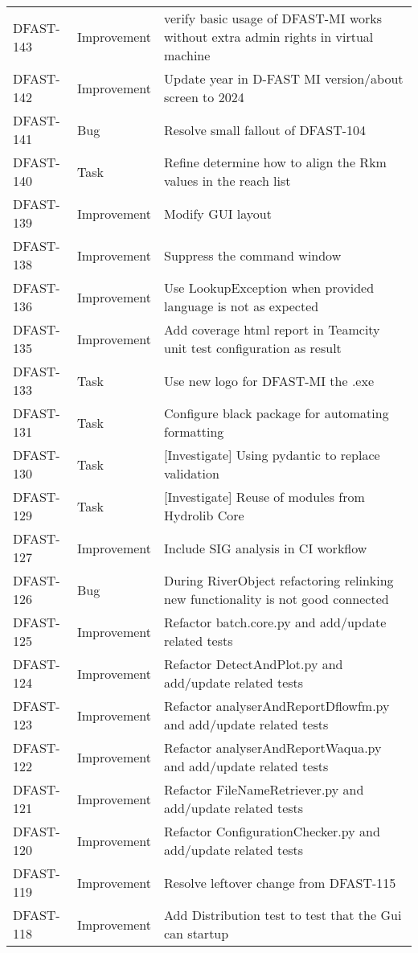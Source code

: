 \documentclass[git]{deltares_manual}
\begin{document}
\begin{longtable}{l|l|p{8cm}}
DFAST-143 & Improvement & verify basic usage of DFAST-MI works without extra admin rights in virtual machine \\
DFAST-142 & Improvement & Update year in D-FAST MI version/about screen to 2024 \\
DFAST-141 & Bug & Resolve small fallout of DFAST-104 \\
DFAST-140 & Task & Refine determine how to align the Rkm values in the reach list \\
DFAST-139 & Improvement & Modify GUI layout \\
DFAST-138 & Improvement & Suppress the command window \\
DFAST-136 & Improvement & Use LookupException when provided language is not as expected \\
DFAST-135 & Improvement & Add coverage html report in Teamcity unit test configuration as result \\
DFAST-133 & Task & Use new logo for DFAST-MI the .exe \\
DFAST-131 & Task & Configure black package for automating formatting \\
DFAST-130 & Task & [Investigate] Using pydantic to replace validation \\
DFAST-129 & Task & [Investigate] Reuse of modules from Hydrolib Core \\
DFAST-127 & Improvement & Include SIG analysis in CI workflow \\
DFAST-126 & Bug & During RiverObject refactoring relinking new functionality is not good connected \\
DFAST-125 & Improvement & Refactor batch.core.py and add/update related tests \\
DFAST-124 & Improvement & Refactor DetectAndPlot.py and add/update related tests \\
DFAST-123 & Improvement & Refactor analyserAndReportDflowfm.py and add/update related tests \\
DFAST-122 & Improvement & Refactor analyserAndReportWaqua.py and add/update related tests \\
DFAST-121 & Improvement & Refactor FileNameRetriever.py and add/update related tests \\
DFAST-120 & Improvement & Refactor ConfigurationChecker.py and add/update related tests \\
DFAST-119 & Improvement & Resolve leftover change from DFAST-115 \\
DFAST-118 & Improvement & Add Distribution test to test that the Gui can startup \\

\end{longtable}
\end{document}
